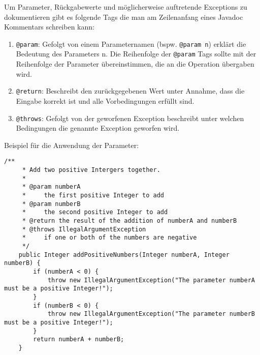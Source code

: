 \begin{Infobox}
    Um Parameter, Rückgabewerte und möglicherweise auftretende Exceptions zu dokumentieren gibt es folgende Tags die man am Zeilenanfang eines Javadoc Kommentars schreiben kann:

    \begin{enumerate}[label=\roman*)]
        \item \lstinline{@param}: 
            Gefolgt von einem Parameternamen (bspw. \lstinline{@param n}) erklärt die Bedeutung des Parameters n.
            Die Reihenfolge der \lstinline{@param} Tags sollte mit der Reihenfolge der Parameter übereinstimmen, die an die Operation übergaben wird.
        \item \lstinline{@return}: 
            Beschreibt den zurückgegebenen Wert unter Annahme, dass die Eingabe korrekt ist und alle Vorbedingungen erfüllt sind.
        \item \lstinline{@throws}: 
            Gefolgt von der geworfenen Exception beschreibt unter welchen Bedingungen die genannte Exception geworfen wird.
    \end{enumerate}

    Beispiel für die Anwendung der Parameter:

    \begin{lstlisting}[numbers=none]
    /**
     * Add two positive Intergers together.
     * 
     * @param numberA
     *     the first positive Integer to add
     * @param numberB
     *     the second positive Integer to add
     * @return the result of the addition of numberA and numberB
     * @throws IllegalArgumentException
     *     if one or both of the numbers are negative
     */
    public Integer addPositiveNumbers(Integer numberA, Integer numberB) {
        if (numberA < 0) {
            throw new IllegalArgumentException("The parameter numberA must be a positive Integer!");
        }
        if (numberB < 0) {
            throw new IllegalArgumentException("The parameter numberB must be a positive Integer!");
        }
        return numberA + numberB;
    }
    \end{lstlisting}
\end{Infobox}
